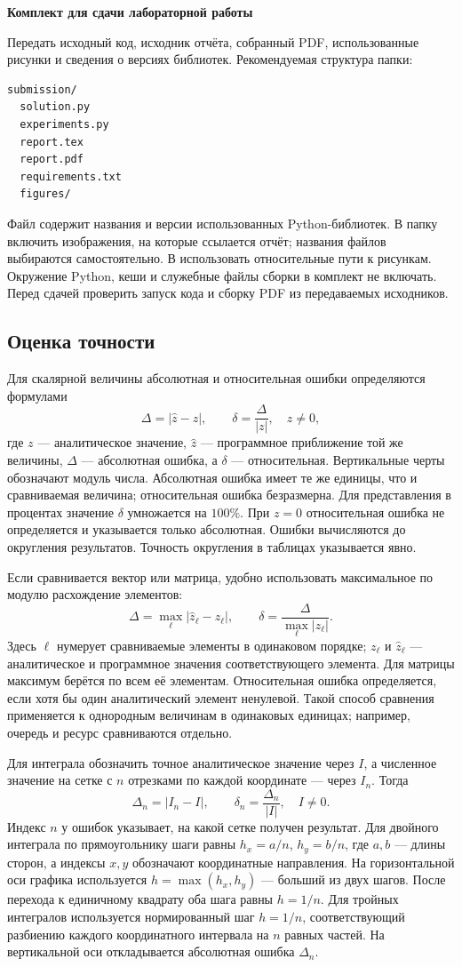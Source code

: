 \documentclass[12pt,a4paper]{article}
\newcommand{\taskhead}[1]{\par\textbf{#1}\par}
\begin{document}
\taskhead{Комплект для сдачи лабораторной работы}
Передать исходный код, исходник отчёта, собранный PDF, использованные рисунки
и сведения о версиях библиотек. Рекомендуемая структура папки:
\begin{verbatim}
submission/
  solution.py
  experiments.py
  report.tex
  report.pdf
  requirements.txt
  figures/
\end{verbatim}
Файл  содержит названия и версии использованных
Python-библиотек. В папку  включить изображения,
на которые ссылается отчёт; названия файлов выбираются самостоятельно.
В  использовать относительные пути к рисункам.
Окружение Python, кеши и служебные файлы сборки в комплект не включать.
Перед сдачей проверить запуск кода и сборку PDF из передаваемых исходников.

\subsection*{Оценка точности}
\label{sec:accuracy}
Для скалярной величины абсолютная и относительная ошибки определяются формулами
\[
\Delta=|\widehat z-z|,\qquad \delta=\frac{\Delta}{|z|},\quad z\ne0,
\]
где $z$ --- аналитическое значение, $\widehat z$ --- программное приближение
той же величины, $\Delta$ --- абсолютная ошибка, а $\delta$ --- относительная.
Вертикальные черты обозначают модуль числа.
Абсолютная ошибка имеет те же единицы, что и сравниваемая величина;
относительная ошибка безразмерна. Для представления в процентах
значение $\delta$ умножается на $100\%$.
При $z=0$ относительная ошибка не определяется и указывается только абсолютная.
Ошибки вычисляются до округления результатов. Точность округления
в таблицах указывается явно.

Если сравнивается вектор или матрица, удобно использовать максимальное
по модулю расхождение элементов:
\[
\Delta=\max_{\ell}|\widehat z_\ell-z_\ell|,\qquad
\delta=\frac{\Delta}{\max_{\ell}|z_\ell|}.
\]
Здесь $\ell$ нумерует сравниваемые элементы в одинаковом порядке;
$z_\ell$ и $\widehat z_\ell$ --- аналитическое и программное значения
соответствующего элемента. Для матрицы максимум берётся по всем её элементам.
Относительная ошибка определяется, если хотя бы один аналитический элемент
ненулевой. Такой способ сравнения применяется к однородным величинам
в одинаковых единицах; например, очередь и ресурс сравниваются отдельно.

Для интеграла обозначить точное аналитическое значение через $I$,
а численное значение на сетке с $n$ отрезками по каждой координате --- через $I_n$.
Тогда
\[
\Delta_n=|I_n-I|,\qquad \delta_n=\frac{\Delta_n}{|I|},\quad I\ne0.
\]
Индекс $n$ у ошибок указывает, на какой сетке получен результат.
Для двойного интеграла по прямоугольнику шаги равны
$h_x=a/n$, $h_y=b/n$, где $a,b$ --- длины сторон, а индексы $x,y$
обозначают координатные направления. На горизонтальной оси графика
используется $h=\max(h_x,h_y)$ --- больший из двух шагов.
После перехода к единичному квадрату оба шага равны $h=1/n$.
Для тройных интегралов используется нормированный шаг $h=1/n$,
соответствующий разбиению каждого координатного интервала на $n$ равных частей.
На вертикальной оси откладывается абсолютная ошибка $\Delta_n$.
\end{document}
